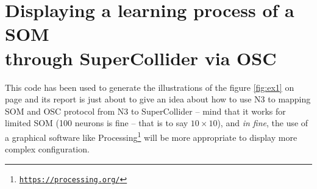 

\section{Displaying a learning process of a SOM \\through SuperCollider via OSC}
\label{ann:color}

\bigskip

This code has been used to generate the illustrations of the figure \ref{fig:ex1} on page \pageref{fig:ex1} and its report is just about to give an idea about how to use N3 to mapping SOM and OSC protocol from N3 to SuperCollider -- mind that it works for limited SOM (100 neurons is fine -- that is to say $10\times10$), and
\textit{in fine}, the use of a graphical software like Processing\footnote{\href{https://processing.org/}{\texttt{\scriptsize https://processing.org/}}} will be more appropriate to display more complex configuration.

\bigskip

